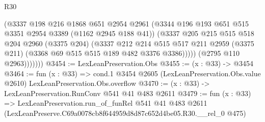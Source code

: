 \begin{lexlean}{R30}
\begin{coremodule}
                  (@3337
                    @198
                    @216
                    @1868
                    @651
                    @2954
                    @2961
                    (@3344 @196 @193 @651 @515 @3351 @2954 @3389 (@1162 @2945 @188 @41))
                    (@3337
                      @205
                      @215
                      @515
                      @518
                      @204
                      @2960
                      (@3375 @204)
                      (@3337
                        @212
                        @214
                        @515
                        @517
                        @211
                        @2959
                        (@3375 @211)
                        (@3368 @69 @515 @515 @189 @482 @3376 @3386)))))
                (@2795 @110 @2963)))))))
@3454 := LexLeanPreservation.Obs
@3455 := (x : @33) -> @3454
@3464 := fun (x : @33) =>
  cond.{1} @3454 @2605 (LexLeanPreservation.Obs.value @2610) LexLeanPreservation.Obs.overflow
@3470 := (x : @33) -> LexLeanPreservation.RunConv @541 @41 @483 @2611
@3479 := fun (x : @33) =>
  LexLeanPreservation.run_of_funRel
    @541
    @41
    @483
    @2611
    (LexLeanPreserve.C69a0078cb8f644959d8d87c652d4be05.R30.__rel_0 @475)
\end{coremodule}
\end{lexlean}

